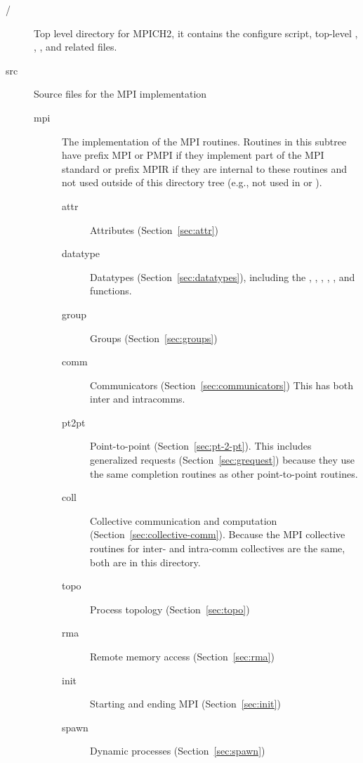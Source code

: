 \documentclass{article}
\begin{document}
\begin{description}
\item[/]Top level directory for MPICH2, it contains the configure script,
  top-level , , , and related
  files. 
\item[src]Source files for the MPI implementation
  \begin{description}
  \item[mpi]The implementation of the MPI routines.  Routines in this
    subtree have prefix MPI or PMPI if they implement part of the MPI
    standard or prefix MPIR if they are internal to these routines and
    not used outside of this directory tree (e.g., not used in
     or ).
    \begin{description}
    \item[attr]Attributes (Section~\ref{sec:attr})
    \item[datatype]Datatypes (Section~\ref{sec:datatypes}), including the
      , , ,
      , , and
       functions.
    \item[group]Groups (Section~\ref{sec:groups})
    \item[comm]Communicators (Section~\ref{sec:communicators})
      This has both inter and intracomms.
    \item[pt2pt]Point-to-point (Section~\ref{sec:pt-2-pt}).  This
    includes generalized requests (Section~\ref{sec:grequest}) because
    they use the same completion  
    routines as other point-to-point routines.
    \item[coll]Collective communication and computation
      (Section~\ref{sec:collective-comm}).  Because the MPI collective
      routines for inter- and intra-comm collectives are the same,
      both are in this directory.
    \item[topo]Process topology (Section~\ref{sec:topo})
    \item[rma]Remote memory access (Section~\ref{sec:rma})
    \item[init]Starting and ending MPI (Section~\ref{sec:init})
    \item[spawn]Dynamic processes (Section~\ref{sec:spawn})

\end{description}
\end{description}
\end{description}
\end{document}
